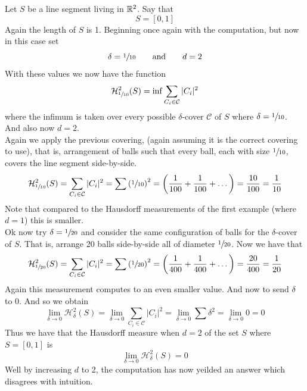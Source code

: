 \documentclass[11pt]{ekblite}
\begin{document}
\begin{example}[Line segment with $d = 2$]
	Let $S$ be a line segment living in $\mathbb{R}^2$. Say that
	\[S = [0,1]\]
	Again the length of $S$ is 1. Beginning once again with the computation, but now in this case set
	\[\delta = \sfrac{1}{10} \qquad \text{and} \qquad d = 2\]
	With these values we now have the function
	\[\mathcal{H}_{\sfrac{1}{10}}^{2} (S) = \inf \sum_{C_i \in \mathcal{C}} |C_i|^2\]
	where the infimum is taken over every possible $\delta$-cover $\mathcal{C}$ of $S$ where $\delta = \sfrac{1}{10}$. And also now $d=2$.
	\\[0.2in]Again we apply the previous covering, (again assuming it is the correct covering to use), that is, arrangement of balls such that every ball, each with size $\sfrac{1}{10}$, covers the line segment side-by-side.
	\[\mathcal{H}_{\sfrac{1}{10}}^{2} (S) = \sum_{C_i \in \mathcal{C}} |C_i|^2 = \sum \left( \sfrac{1}{10} \right)^2 = \left( \frac{1}{100} + \frac{1}{100} + \dots \right) = \frac{10}{100} = \frac{1}{10}\]
	Note that compared to the Hausdorff measurements of the first example (where $d = 1$) this is smaller.
	\\[0.2in]Ok now try $\delta = \sfrac{1}{20}$ and consider the same configuration of balls for the $\delta$-cover of $S$. That is, arrange 20 balls side-by-side all of diameter $\sfrac{1}{20}$. Now we have that
	\[\mathcal{H}_{\sfrac{1}{20}}^{2} (S) = \sum_{C_i \in \mathcal{C}} |C_i|^2 = \sum \left( \sfrac{1}{20} \right)^2 = \left( \frac{1}{400} + \frac{1}{400} + \dots \right) = \frac{20}{400} = \frac{1}{20}\]
	Again this measurement computes to an even smaller value.
	And now to send $\delta$ to 0. And so we obtain
	\[\lim_{\delta \rightarrow 0} \mathcal{H}_{\delta}^{2} (S) = \lim_{\delta \rightarrow 0} \sum_{C_i \in \mathcal{C}} |C_i|^2 = \lim_{\delta \rightarrow 0} \sum \delta^2 =  \lim_{\delta \rightarrow 0} 0 = 0\]
	Thus we have that the Hausdorff measure when $d = 2$ of the set $S$ where $S = [0,1]$ is
	\[\lim_{\delta \rightarrow 0} \mathcal{H}_{\delta}^{2} (S) = 0\]
	Well by increasing $d$ to 2, the computation has now yeilded an answer which disagrees with intuition.
\end{example}
\end{document}
